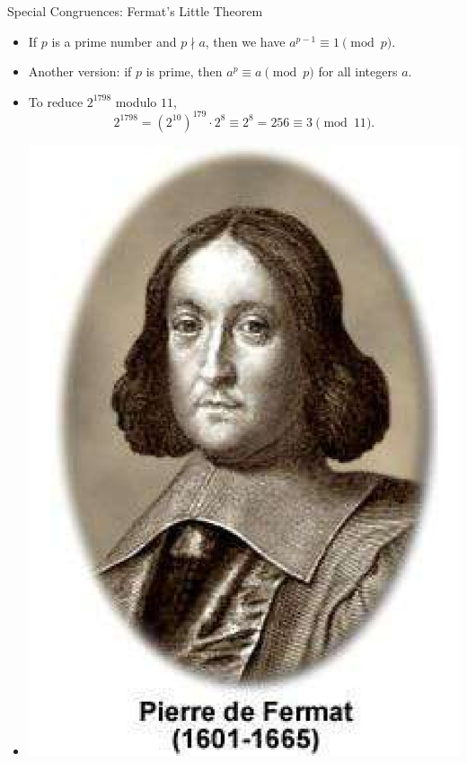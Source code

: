 \documentclass[ %
 usenames,dvipsnames,
aspectratio=169,11pt ]{beamer}
\newenvironment{stepitemize}{\begin{itemize}[<+->]}{\end{itemize} }
\begin{document}
\begin{frame}{Special Congruences: Fermat's Little Theorem}
\begin{stepitemize}
\item If $p$ is a prime number and $p\nmid a$, then we have $a^{p-1} \equiv 1 \pmod{p}$.
\item Another version: if $p$ is prime, then $a^p\equiv a \pmod{p}$ for all integers $a$.
\item To reduce $2^{1798}$ modulo $11$,
$$2^{1798} = (2^{10})^{179}\cdot 2^8 \equiv 2^8=256\equiv 3 \pmod{11}. $$
\item[]     \begin{center}
    \includegraphics[scale=.180]{images/fermat.pdf}
\end{center}

\end{stepitemize}
\end{frame}
\end{document}
